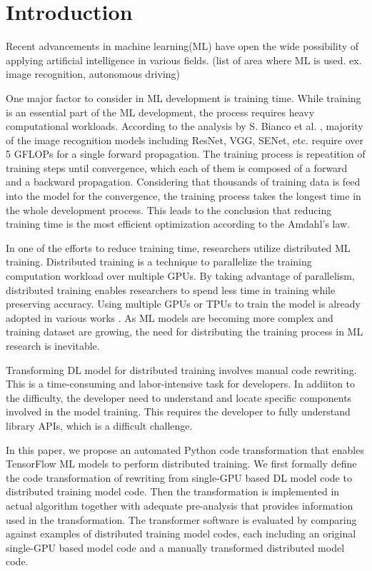 \section{Introduction}\label{sec:intro}

Recent advancements in machine learning(ML) have open the wide possibility of
applying artificial intelligence in various fields.
(list of area where ML is used. ex. image recognition, autonomous driving)

One major factor to consider in ML development is training time.
While training is an essential part of the ML development,
the process requires heavy computational workloads.
According to the analysis by S. Bianco et al. \cite{bianco2018benchmark},
majority of the image recognition models including ResNet, VGG, SENet, etc.
require over 5 GFLOPs for a single forward propagation.
The training process is repeatition of training steps until convergence,
which each of them is composed of a forward and a backward propagation.
Considering that thousands of training data is feed into the model
for the convergence, the training process takes the longest time
in the whole development process. This leads to the conclusion that
reducing training time is the most efficient optimization according to
the Amdahl's law.

In one of the efforts to reduce training time, 
researchers utilize distributed ML training.
Distributed training is a technique to parallelize the training computation
workload over multiple GPUs.
By taking advantage of parallelism, distributed training enables researchers
to spend less time in training while preserving accuracy.
Using multiple GPUs or TPUs to train the model is already adopted
in various works \cite{brown2020gpt-3} \cite{silver2017alphazero}
\cite{zhang2019distrspeech} \cite{tian2020distrwebattack}.
As ML models are becoming more complex and training dataset are growing,
the need for distributing the training process in ML research is inevitable.

Transforming DL model for distributed training involves manual code rewriting.
This is a time-consuming and labor-intensive task for developers.
In addiiton to the difficulty, the developer need to understand and locate 
specific components involved in the model training.
This requires the developer to fully understand library APIs,
which is a difficult challenge.


In this paper, we propose an automated Python code transformation that enables
TensorFlow ML models to perform distributed training.
We first formally define the code transformation of rewriting from
single-GPU based DL model code to distributed training model code.
Then the transformation is implemented in actual algorithm together with
adequate pre-analysis that provides information used in the transformation.
The transformer software is evaluated by comparing against 
examples of distributed training model codes, 
each including an original single-GPU based model code 
and a manually transformed distributed model code.

